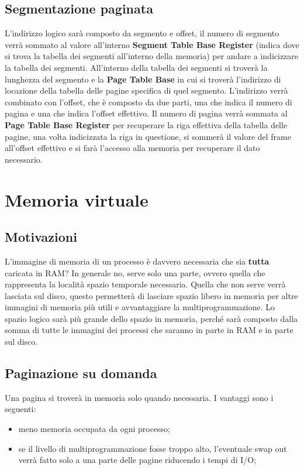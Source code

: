 \documentclass[a4paper, 12pt]{book}
\begin{document}
\section{Segmentazione paginata}

L'indirizzo logico sarà composto da segmento e offset, il numero di segmento verrà sommato al valore all'interno \textbf{Segment Table Base Register} (indica dove si trova la tabella dei segmenti all'interno della memoria) 
per andare a indicizzare la tabella dei segmenti. All'interno della tabella dei segmenti si troverà la lunghezza del segmento e 
la \textbf{Page Table Base} in cui si troverà l'indirizzo di locazione della tabella delle pagine specifica di quel segmento. 
L'indirizzo verrà combinato con l'offset, che è composto da due parti, una che indica il numero di pagina e una che indica 
l'offset effettivo. Il numero di pagina verrà sommata al \textbf{Page Table Base Register} per recuperare la riga effettiva della 
tabella delle pagine, una volta indicizzata la riga in questione, si sommerà il valore del frame all'offset effettivo e si farà 
l'accesso alla memoria per recuperare il dato necessario. 

\chapter{Memoria virtuale}

\section{Motivazioni}

L'immagine di memoria di un processo è davvero necessaria che sia \textbf{tutta} caricata in RAM? In generale no, serve solo una parte,
ovvero quella che rappresenta la località spazio temporale necessaria. Quella che non serve verrà lasciata sul disco, 
questo permetterà di lasciare spazio libero in memoria per altre immagini di memoria più utili e avvantaggiare la multiprogrammazione.
Lo spazio logico sarà più grande dello spazio in memoria, perché sarà composto dalla somma di tutte le immagini dei processi che 
saranno in parte in RAM e in parte sul disco. 

\section{Paginazione su domanda}

Una pagina si troverà in memoria solo quando necessaria. I vantaggi sono i seguenti:
\begin{itemize}
    \item meno memoria occupata da ogni processo;
    \item se il livello di multiprogrammazione fosse troppo alto, l'eventuale swap out verrà fatto solo a una parte delle pagine riducendo i tempi di I/O;
\end{itemize}
\end{document}
